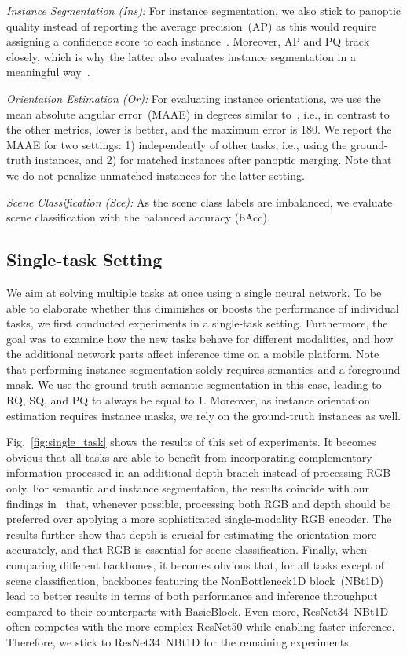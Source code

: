 \documentclass[conference]{IEEEtran}
\begin{document}
\textit{Instance Segmentation (Ins):} \enspace For instance segmentation, we also stick to panoptic quality instead of reporting the average precision~(AP) as this would require assigning a confidence score to each instance~\cite{Coco-eccv2014}.
Moreover, AP and PQ track closely, which is why the latter also evaluates instance segmentation in a meaningful way~\cite{PanopticSegmentation-cvpr2019}.

\textit{Orientation Estimation (Or):} \enspace For evaluating instance orientations, we use the mean absolute angular error~(MAAE) in degrees similar to~\cite{DeepOrientation-iros2019, MTPersonPerception-iros2020}, i.e., in contrast to the other metrics, lower is better, and the maximum error is 180.
We report the MAAE for two settings: 1) independently of other tasks, i.e., using the ground-truth instances, and 2) for matched instances after panoptic merging.
Note that we do not penalize unmatched instances for the latter setting.

\textit{Scene Classification (Sce):} \enspace As the scene class labels are imbalanced, we evaluate scene classification with the balanced accuracy (bAcc).

\subsection{Single-task Setting}
\label{sec:experiments:single_task}
We aim at solving multiple tasks at once using a single neural network. 
To be able to elaborate whether this diminishes or boosts the performance of individual tasks, we first conducted experiments in a single-task setting.
Furthermore, the goal was to examine how the new tasks behave for different modalities, and how the additional network parts affect inference time on a mobile platform. 
Note that performing instance segmentation solely requires semantics and a foreground mask. 
We use the ground-truth semantic segmentation in this case, leading to RQ, SQ, and PQ to always be equal to 1.
Moreover, as instance orientation estimation requires instance masks, we rely on the ground-truth instances as well.

Fig.~\ref{fig:single_task} shows the results of this set of experiments.
It becomes obvious that all tasks are able to benefit from incorporating complementary information processed in an additional depth branch instead of processing RGB only.
For semantic and instance segmentation, the results coincide with our findings in~\cite{esanet2021icra} that, whenever possible, processing both RGB and depth should be preferred over applying a more sophisticated single-modality RGB encoder.
The results further show that depth is crucial for estimating the orientation more accurately, and that RGB is essential for scene classification.
Finally, when comparing different backbones, it becomes obvious that, for all tasks except of scene classification, backbones featuring the NonBottleneck1D block~(NBt1D) lead to better results in terms of both performance and inference throughput compared to their counterparts with BasicBlock. 
Even more, ResNet34~NBt1D often competes with the more complex ResNet50 while enabling faster inference.
Therefore, we stick to ResNet34~NBt1D for the remaining experiments.
\end{document}
